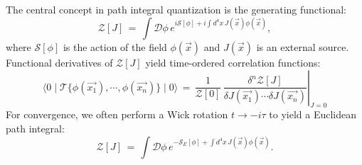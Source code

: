 \documentclass[11pt]{article}
\numberwithin{equation}{section}
\begin{document}
The central concept in path integral quantization is the generating functional:
\begin{equation}
    \mathcal Z[J]\,=\,\int\!\mathcal D\phi\,e^{i\mathcal S[\phi]+i\int\!d^4x\,J(\Vec{x})\phi(\Vec{x})},
\end{equation}
where $\mathcal{S}[\phi]$ is the action of the field $\phi(\Vec{x})$ and $J(\Vec{x})$ is an external source.\\
Functional derivatives of $\mathcal{Z}[J]$ yield time-ordered correlation functions:
\begin{equation}
    \langle0\mid\mathcal T\{\phi(\Vec{x_1}),\cdots,\phi(\Vec{x_n})\}\mid0\rangle\,=\,\left.\frac{1}{\mathcal{Z}[0]}\,\frac{\delta^n\mathcal{Z}[J]}{\delta J(\Vec{x_1})\cdots\delta J(\Vec{x_n})}\right|_{J=0}
\end{equation}
For convergence, we often perform a Wick rotation $t\rightarrow -i\tau$ to yield a Euclidean path integral:
\begin{equation}
    \mathcal{Z}[J]\,=\,\int\!\mathcal{D}\phi\,e^{-\mathcal{S}_{E}[\phi]+\int\!d^4x\,J(\Vec{x})\phi(\Vec{x})}.
\end{equation}
\end{document}
